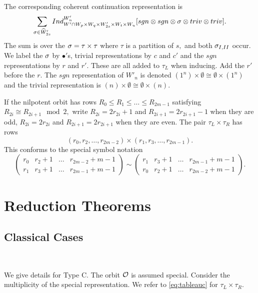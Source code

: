 \documentclass[11pt ,reqno]{amsart}
\begin{document}
The corresponding coherent continuation representation is 
\begin{equation}
\sum_{{\sigma}\in\widehat{W}'_{2s}}
Ind_{W'\cap W_p\times W_q\times W'_{2s}\times W_t\times W_u}^{W'_n}
[sgn\otimes sgn \otimes{\sigma}\otimes triv\otimes triv].
\end{equation}
The sum is over the ${\sigma}=\tau\times\tau$ where $\tau$ is a partition
of $s,$ and both ${\sigma}_{I,II}$ occur.   We label the ${\sigma}$ by $\bullet'$s, trivial representations
by $c$ and $c'$ and the 
$sgn$ representations by $r$ and $r'.$ These are all added to $\tau_L$ 
when inducing. {\clrr Add the $r'$ before the $r.$}
The $sgn$ representation of $W'_n$ is denoted
$(1^n)\times\emptyset\cong \emptyset\times (1^n)$ and the trivial
representation is $(n)\times\emptyset\cong \emptyset\times (n).$ 

\bigskip
If the nilpotent orbit has rows $R_0\le R_1\le\dots\le R_{2m-1}$
satisfying $R_{2i}\cong R_{2i+1}\mod{2},$ write
$R_{2i}=2r_{2i}+1$ and $R_{2i+1}=2r_{2i+1}-1$ when they are odd,
$R_{2i}=2r_{2i}$ and $R_{2i+1}=2r_{2i+1}$ when they are even. The pair
$\tau_L\times\tau_R$ has rows 
\begin{equation}
  \label{eq:weyld}
(r_0,r_2,\dots ,r_{2m-2})\times   (r_1,r_3,\dots ,r_{2m-1}).
\end{equation}
This conforms to the special
symbol notation
\begin{equation}\label{eq:symbold}
\begin{pmatrix} 
r_0&r_2+1&\dots &r_{2m-2}+m-1\\
r_1&r_3+1&\dots &r_{2m-1}+m-1
\end{pmatrix}
\sim
\begin{pmatrix} 
  r_1&r_3+1&\dots &r_{2m-1}+m-1\\
  r_0&r_2+1&\dots &r_{2m-2}+m-1
\end{pmatrix}.
\end{equation}

\section{Reduction Theorems}\label{sec:reduction}
\subsection{Classical Cases}\

{\clrr We give details for Type C}. The orbit $\mathcal O$ is assumed special.
Consider the multiplicity of the special representation. We refer to
\eqref{eq:tableauc} for $\tau_L\times \tau_R.$ 
\end{document}
